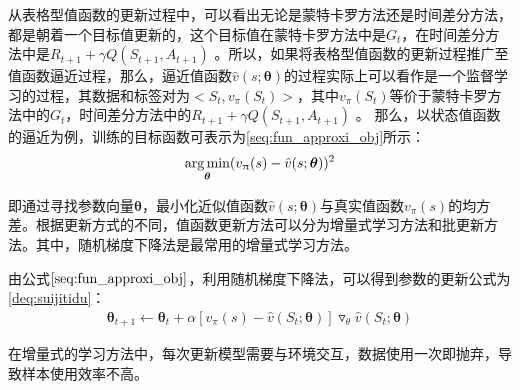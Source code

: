 从表格型值函数的更新过程中，可以看出无论是蒙特卡罗方法还是时间差分方法，都是朝着一个目标值更新的，这个目标值在蒙特卡罗方法中是$G_{t}$，在时间差分方法中是$R_{t+1}+\gamma Q(S_{t+1},A_{t+1})$
。所以，如果将表格型值函数的更新过程推广至值函数逼近过程，那么，逼近值函数$\hat{v}(s;\bm{\theta})$的过程实际上可以看作是一个监督学习的过程，其数据和标签对为$<S_{t}, v_{\pi}(S_{t})>$，其中$v_{\pi}(S_{t})$等价于蒙特卡罗方法中的$G_{t}$，时间差分方法中的$R_{t+1}+\gamma Q(S_{t+1},A_{t+1})$
。
那么，以状态值函数的逼近为例，训练的目标函数可表示为\eqref{seq:fun_approxi_obj}所示：
\begin{equation}
\label{seq:fun_approxi_obj}
\begin{aligned}
\operatorname*{arg\,min}_{\bm{\theta}}(v_{\uppi}(s)-\hat{v}(s;\bm{\theta}))^2
\end{aligned}
\end{equation}

即通过寻找参数向量$\bm{\theta}$，最小化近似值函数$\hat{v}(s;\bm{\theta})$与真实值函数$v_{\pi}(s)$的均方差。根据更新方式的不同，值函数更新方法可以分为增量式学习方法和批更新方法。其中，随机梯度下降法是最常用的增量式学习方法。

由公式$\eqref{seq:fun_approxi_obj}$，利用随机梯度下降法，可以得到参数的更新公式为\eqref{deq:suijitidu}：
\begin{equation}\label{deq:suijitidu}
\begin{aligned}
\bm{\theta}_{t+1} \gets \bm{\theta}_{t} + \alpha[v_{\pi}(s)-\hat{v}(S_{t};\bm{\theta})]\triangledown_{\theta} \hat{v}(S_{t};\bm{\theta})
\end{aligned}
\end{equation}



在增量式的学习方法中，每次更新模型需要与环境交互，数据使用一次即抛弃，导致样本使用效率不高。

